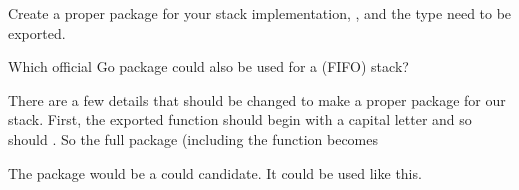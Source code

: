 \begin{Exercise}[title={Stack as package},difficulty=2]
\label{ex:stack-package}
\Question\label{ex:stack-package q1} Create a proper package for your
stack implementation, ,  and the  type need to be
exported.

\Question\label{ex:stack-package q2} Which official Go package could
also be used for a (FIFO) stack?

\end{Exercise}

\begin{Answer}
\Question There are a few details that should be changed to make a proper package
for our stack. First, the exported function should begin with a capital 
letter and so should . So the full package (including the
 function becomes


\Question The  package would be a could candidate. It
could be used like this.


\end{Answer}
